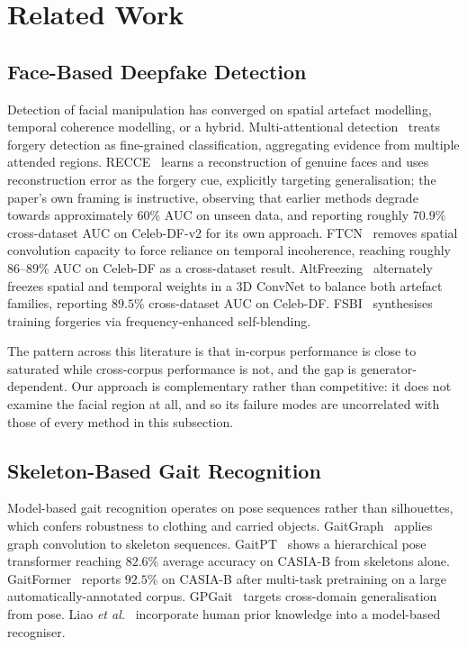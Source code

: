 \documentclass[journal]{IEEEtran}
\begin{document}
\section{Related Work}
\label{sec:related}

\subsection{Face-Based Deepfake Detection}

Detection of facial manipulation has converged on spatial artefact modelling,
temporal coherence modelling, or a hybrid. Multi-attentional
detection~\cite{multi_attn} treats forgery detection as fine-grained
classification, aggregating evidence from multiple attended regions.
RECCE~\cite{recce} learns a reconstruction of genuine faces and uses
reconstruction error as the forgery cue, explicitly targeting generalisation;
the paper's own framing is instructive, observing that earlier methods degrade
towards approximately $60\%$ AUC on unseen data, and reporting roughly $70.9\%$
cross-dataset AUC on Celeb-DF-v2 for its own approach. FTCN~\cite{ftcn} removes
spatial convolution capacity to force reliance on temporal incoherence,
reaching roughly $86$--$89\%$ AUC on Celeb-DF as a cross-dataset result.
AltFreezing~\cite{altfreezing} alternately freezes spatial and temporal weights
in a 3D ConvNet to balance both artefact families, reporting $89.5\%$
cross-dataset AUC on Celeb-DF. FSBI~\cite{fsbi} synthesises training forgeries
via frequency-enhanced self-blending.

The pattern across this literature is that in-corpus performance is close to
saturated while cross-corpus performance is not, and the gap is
generator-dependent. Our approach is complementary rather than competitive: it does not
examine the facial region at all, and so its failure modes are uncorrelated
with those of every method in this subsection.

\subsection{Skeleton-Based Gait Recognition}

Model-based gait recognition operates on pose sequences rather than
silhouettes, which confers robustness to clothing and carried objects.
GaitGraph~\cite{gaitgraph} applies graph convolution to skeleton sequences.
GaitPT~\cite{gaitpt} shows a hierarchical pose transformer reaching $82.6\%$
average accuracy on CASIA-B from skeletons alone. GaitFormer~\cite{gaitformer}
reports $92.5\%$ on CASIA-B after multi-task pretraining on a large
automatically-annotated corpus. GPGait~\cite{gpgait} targets cross-domain
generalisation from pose. Liao \emph{et al.}~\cite{liao_gait} incorporate human
prior knowledge into a model-based recogniser.
\end{document}
